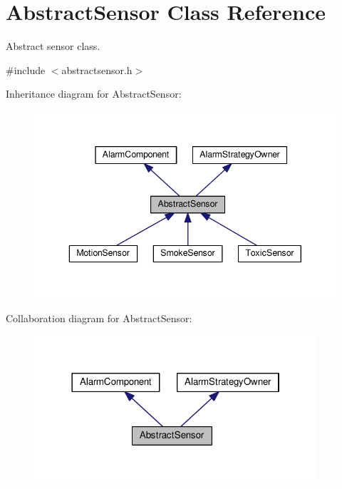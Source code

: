 \hypertarget{classAbstractSensor}{}\section{Abstract\+Sensor Class Reference}
\label{classAbstractSensor}


Abstract sensor class.  




{\ttfamily \#include $<$abstractsensor.\+h$>$}



Inheritance diagram for Abstract\+Sensor\+:\nopagebreak
\begin{figure}[H]
\begin{center}
\leavevmode
\includegraphics[width=343pt]{classAbstractSensor__inherit__graph}
\end{center}
\end{figure}


Collaboration diagram for Abstract\+Sensor\+:\nopagebreak
\begin{figure}[H]
\begin{center}
\leavevmode
\includegraphics[width=298pt]{classAbstractSensor__coll__graph}
\end{center}
\end{figure}
